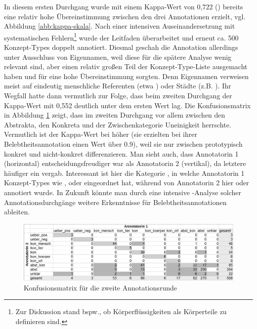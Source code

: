 In diesem ersten Durchgang wurde mit einem Kappa-Wert von 0,722 () bereits eine relativ hohe Übereinstimmung zwischen den drei Annotationen erzielt, vgl. Abbildung \ref{abb:kappa-skala}. 
Nach einer intensiven Auseinandersetzung mit systematischen Fehlern\footnote{Zur Diskussion stand bspw., ob Körperflüssigkeiten als Körperteile zu definieren sind.} wurde der Leitfaden überarbeitet und erneut ca. 500 Konzept-Types doppelt annotiert. Diesmal geschah die Annotation allerdings unter Ausschluss von Eigennamen, weil diese für die spätere Analyse wenig relevant sind, aber einen relativ großen Teil der Konzept-Type-Liste ausgemacht haben und für eine hohe Übereinstimmung sorgten. Denn Eigennamen verweisen meist auf eindeutig menschliche Referenten (etwa ) oder Städte (z.B. ).
Ihr Wegfall hatte dann vermutlich zur Folge, dass beim zweiten Durchgang der Kappa-Wert mit 0,552 deutlich unter dem ersten Wert lag. 
Die Konfusionsmatrix in Abbildung \ref{abb:confusion} zeigt, dass im zweiten Durchgang vor allem zwischen den Abstrakta, den Konkreta und der Zwischenkategorie  Uneinigkeit herrschte. 
Vermutlich ist der Kappa-Wert bei \textcite{Zaenen2004} höher (sie erzielten bei ihrer Belebtheitsannotation einen Wert über 0.9), weil sie nur zwischen prototypisch konkret und nicht-konkret differenzieren. Man sieht auch, dass Annotatorin 1 (horizontal) entscheidungsfreudiger war als Annotatorin 2 (vertikal), da letztere häufiger ein  vergab. Interessant ist hier die Kategorie , in welche Annotatorin 1 Konzept-Types wie ,  oder  eingeordnet hat, während von Annotatorin 2 hier  oder  annotiert wurde. In Zukunft könnte man durch eine intensive -Analyse solcher Annotationsdurchgänge weitere Erkenntnisse für Belebtheitsannotationen ableiten.  
 
\begin{figure}
\begin{center}
  \includegraphics[width=12 cm]{images/confusionsmatrix-neu-sw.jpg}
\caption {Konfusionsmatrix für die zweite Annotationsrunde}
\label{abb:confusion}
\end{center}
\end{figure} 

